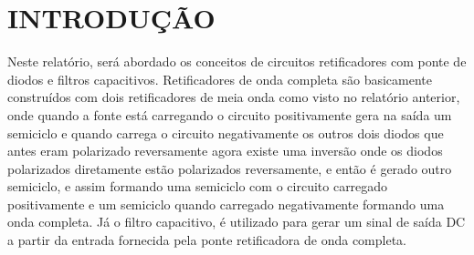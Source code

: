 \chapter{INTRODUÇÃO}

Neste relatório, será abordado os conceitos de circuitos retificadores com ponte de diodos e filtros capacitivos. Retificadores de onda completa são basicamente construídos com dois retificadores de meia onda como visto no relatório anterior, onde quando a fonte está carregando o circuito positivamente gera na saída um semiciclo e quando carrega o circuito negativamente os outros dois diodos que antes eram polarizado reversamente agora existe uma inversão onde os diodos polarizados diretamente estão polarizados reversamente, e então é gerado outro semiciclo, e assim formando uma semiciclo com o circuito carregado positivamente e um semiciclo quando carregado negativamente formando uma onda completa. Já o filtro capacitivo, é utilizado para gerar um sinal de saída DC a partir da entrada fornecida pela ponte retificadora de onda completa.